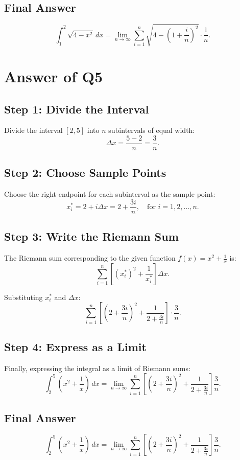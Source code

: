 \documentclass{article}
\begin{document}
\subsection*{Final Answer}
\[
\boxed{\int_1^2 \sqrt{4 - x^2} \, dx 
= \lim_{n \to \infty} \sum_{i=1}^{n} \sqrt{4 - \left(1 + \frac{i}{n}\right)^2} \cdot \frac{1}{n}.}
\]
\section*{Answer of Q5}

\subsection*{Step 1: Divide the Interval}
Divide the interval \([2,5]\) into \(n\) subintervals of equal width:
\[
\Delta x = \frac{5 - 2}{n} = \frac{3}{n}.
\]

\subsection*{Step 2: Choose Sample Points}
Choose the right-endpoint for each subinterval as the sample point:
\[
x_i^* = 2 + i \Delta x = 2 + \frac{3i}{n}, \quad \text{for } i = 1, 2, \dots, n.
\]

\subsection*{Step 3: Write the Riemann Sum}
The Riemann sum corresponding to the given function \(f(x) = x^2 + \frac{1}{x}\) is:
\[
\sum_{i=1}^n \left[ \left(x_i^*\right)^2 + \frac{1}{x_i^*} \right] \Delta x.
\]

Substituting \(x_i^*\) and \(\Delta x\):
\[
\sum_{i=1}^n \left[ \left(2 + \frac{3i}{n}\right)^2 + \frac{1}{2 + \frac{3i}{n}} \right] \cdot \frac{3}{n}.
\]

\subsection*{Step 4: Express as a Limit}
Finally, expressing the integral as a limit of Riemann sums:
\[
\int_2^5 \left( x^2 + \frac{1}{x} \right) \, dx = \lim_{n \to \infty} \sum_{i=1}^n \left[ \left(2 + \frac{3i}{n}\right)^2 + \frac{1}{2 + \frac{3i}{n}} \right] \frac{3}{n}.
\]

\subsection*{Final Answer}
\[
\boxed{
\int_2^5 \left( x^2 + \frac{1}{x} \right) \, dx = \lim_{n \to \infty} \sum_{i=1}^n \left[ \left(2 + \frac{3i}{n}\right)^2 + \frac{1}{2 + \frac{3i}{n}} \right] \frac{3}{n}.}
\]
\end{document}
